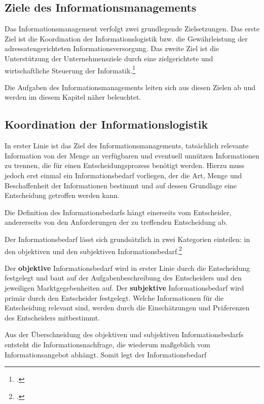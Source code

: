 \subsection{Ziele des Informationsmanagements}
Das Informationsmanagement verfolgt zwei grundlegende Zielsetzungen.
Das erste Ziel ist die Koordination der Informationslogistik bzw. die Gewährleistung der adressatengerichteten Informationsversorgung.
Das zweite Ziel ist die Unterstützung der Unternehmensziele durch eine zielgerichtete und wirtschaftliche Steuerung der Informatik.\footcite[Vgl.][3-21]{zarnekow_intergriertes_2004}

Die Aufgaben des Informationsmanagements leiten sich aus diesen Zielen ab und werden im diesem Kapitel näher beleuchtet.

\subsection{Koordination der Informationslogistik}
\label{subsection_koordination_informationslogistik}
In erster Linie ist das Ziel des Informationsmanagements, tatsächlich relevante Information von der Menge an verfügbaren und eventuell unnützen Informationen zu trennen, die für einen Entscheidungsprozess benötigt werden. Hierzu muss jedoch erst einmal ein Informationsbedarf vorliegen, der die Art, Menge und Beschaffenheit der Informationen bestimmt und auf dessen Grundlage eine Entscheidung getroffen werden kann.

Die Definition des Informationsbedarfs hängt einerseits vom Entscheider, andererseits von den Anforderungen der zu treffenden Entscheidung ab.

Der Informationsbedarf lässt sich grundsätzlich in zwei Kategorien einteilen: in den objektiven und den subjektiven Informationsbedarf.\footcite[Vgl.][81-82]{picot_grenzenlos_2003}

Der \textbf{objektive} Informationsbedarf wird in erster Linie durch die Entscheidung festgelegt und baut auf der Aufgabenbeschreibung des Entscheiders und den jeweiligen Marktgegebenheiten auf.
Der \textbf{subjektive} Informationsbedarf wird primär durch den Entscheider festgelegt. Welche Informationen für die Entscheidung relevant sind, werden durch die Einschätzungen und Präferenzen des Entscheiders mitbestimmt.

Aus der Überschneidung des objektiven und subjektiven Informationsbedarfs entsteht die Informationsnachfrage, die wiederum maßgeblich vom Informationsangebot abhängt. Somit legt der Informationsbedarf

